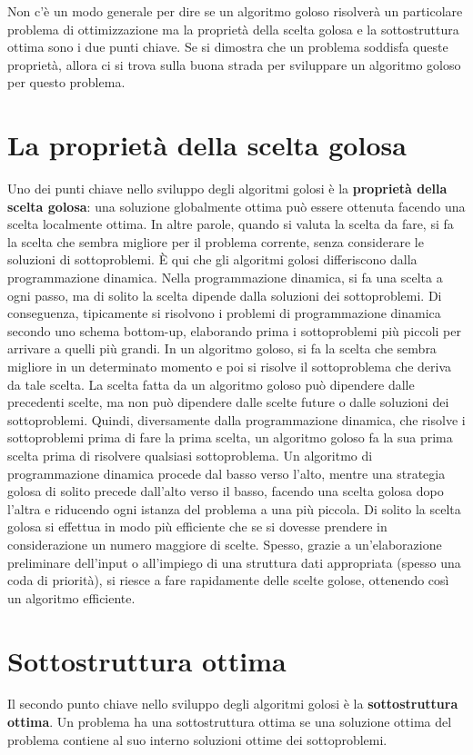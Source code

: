 \documentclass[10pt, a4paper]{report}
\begin{document}
Non c'è un modo generale per dire se un algoritmo goloso risolverà un particolare problema di ottimizzazione ma la proprietà della scelta golosa e la sottostruttura ottima sono i due punti chiave. Se si dimostra che un problema soddisfa queste proprietà, allora ci si trova sulla buona strada per sviluppare un algoritmo goloso per questo problema.
\section{La proprietà della scelta golosa}
Uno dei punti chiave nello sviluppo degli algoritmi golosi è la \textbf{proprietà della scelta golosa}: una soluzione globalmente ottima può essere ottenuta facendo una scelta localmente ottima. In altre parole, quando si valuta la scelta da fare, si fa la scelta che sembra migliore per il problema corrente, senza considerare le soluzioni di sottoproblemi. È qui che gli algoritmi golosi differiscono dalla programmazione dinamica. Nella programmazione dinamica, si fa una scelta a ogni passo, ma di solito la scelta dipende dalla soluzioni dei sottoproblemi. Di conseguenza, tipicamente si risolvono i problemi di programmazione dinamica secondo uno schema bottom-up, elaborando prima i sottoproblemi più piccoli per arrivare a quelli più grandi. In un algoritmo goloso, si fa la scelta che sembra migliore in un determinato momento e poi si risolve il sottoproblema che deriva da tale scelta. La scelta fatta da un algoritmo goloso può dipendere dalle precedenti scelte, ma non può dipendere dalle scelte future o dalle soluzioni dei sottoproblemi. Quindi, diversamente dalla programmazione dinamica, che risolve i sottoproblemi prima di fare la prima scelta, un algoritmo goloso fa la sua prima scelta prima di risolvere qualsiasi sottoproblema. Un algoritmo di programmazione dinamica procede dal basso verso l'alto, mentre una strategia golosa di solito precede dall'alto verso il basso, facendo una scelta golosa dopo l'altra e riducendo ogni istanza del problema a una più piccola. Di solito la scelta golosa si effettua in modo più efficiente che se si dovesse prendere in considerazione un numero maggiore di scelte. Spesso, grazie a un'elaborazione preliminare dell'input o all'impiego di una struttura dati appropriata (spesso una coda di priorità), si riesce a fare rapidamente delle scelte golose, ottenendo così un algoritmo efficiente.
\section{Sottostruttura ottima}
Il secondo punto chiave nello sviluppo degli algoritmi golosi è la \textbf{sottostruttura ottima}. Un problema ha una sottostruttura ottima se una soluzione ottima del problema contiene al suo interno soluzioni ottime dei sottoproblemi.
\end{document}
